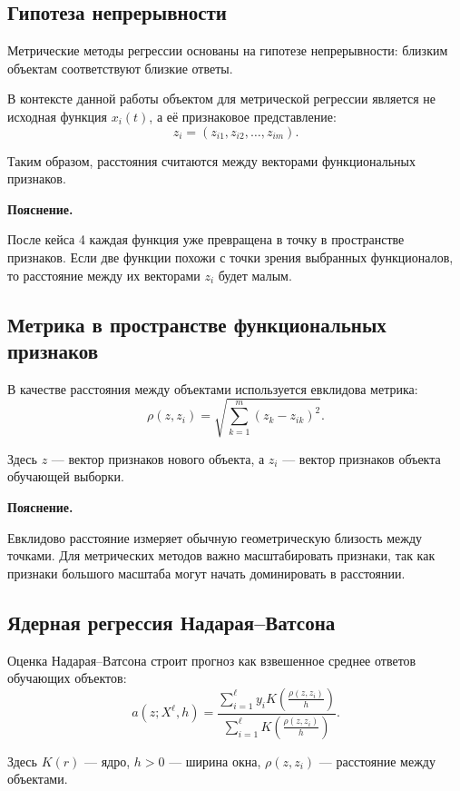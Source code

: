 \documentclass[14pt,a4paper]{extarticle}
\newenvironment{explanation}
{
    \vspace{0.2cm}
    \noindent\textbf{Пояснение.}
}
{
    \vspace{0.2cm}
}
\begin{document}
\subsection{Гипотеза непрерывности}

Метрические методы регрессии основаны на гипотезе непрерывности: близким объектам соответствуют близкие ответы.

В контексте данной работы объектом для метрической регрессии является не исходная функция \(x_i(t)\), а её признаковое представление:
\[
z_i=(z_{i1},z_{i2},\dots,z_{im}).
\]

Таким образом, расстояния считаются между векторами функциональных признаков.

\begin{explanation}
После кейса 4 каждая функция уже превращена в точку в пространстве признаков. Если две функции похожи с точки зрения выбранных функционалов, то расстояние между их векторами \(z_i\) будет малым.
\end{explanation}

\subsection{Метрика в пространстве функциональных признаков}

В качестве расстояния между объектами используется евклидова метрика:
\[
\rho(z,z_i)=
\sqrt{
\sum_{k=1}^{m}(z_k-z_{ik})^2
}.
\]

Здесь \(z\) — вектор признаков нового объекта, а \(z_i\) — вектор признаков объекта обучающей выборки.

\begin{explanation}
Евклидово расстояние измеряет обычную геометрическую близость между точками. Для метрических методов важно масштабировать признаки, так как признаки большого масштаба могут начать доминировать в расстоянии.
\end{explanation}

\subsection{Ядерная регрессия Надарая--Ватсона}

Оценка Надарая--Ватсона строит прогноз как взвешенное среднее ответов обучающих объектов:
\[
a(z;X^\ell,h)=
\frac{
\sum_{i=1}^{\ell} y_i K\left(\frac{\rho(z,z_i)}{h}\right)
}{
\sum_{i=1}^{\ell} K\left(\frac{\rho(z,z_i)}{h}\right)
}.
\]

Здесь \(K(r)\) — ядро, \(h>0\) — ширина окна, \(\rho(z,z_i)\) — расстояние между объектами.
\end{document}
